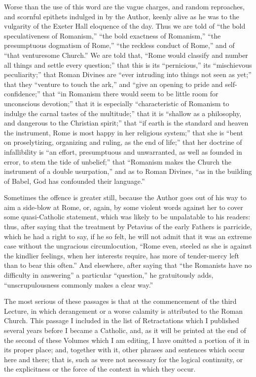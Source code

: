 Worse than the use of this word are the vague charges, and random
reproaches, and scornful epithets indulged in by the Author, keenly
alive as he was to the vulgarity of the Exeter Hall eloquence of the
day. Thus we are told of ``the bold speculativeness of
Romanism,'' ``the bold exactness of Romanism,'' ``the
presumptuous dogmatism of Rome,'' ``the reckless conduct of
Rome,'' and of ``that venturesome Church.'' We are told
that, ``Rome would classify and number all things and settle every
question;'' that this is its ``pernicious,'' its
``mischievous peculiarity;'' that Roman Divines are ``ever
intruding into things not seen as yet;'' that they ``venture
to touch the ark,'' and ``give an opening to pride and
self-confidence;'' that ``in Romanism there would seem to be
little room for unconscious devotion;'' that it is especially
``characteristic of Romanism to indulge the carnal tastes of the
multitude;'' that it is ``shallow as a philosophy, and
dangerous to the Christian spirit;'' that ``if earth is the
standard and heaven the instrument, Rome is most happy in her
religious system;'' that she is ``bent on proselytizing,
organizing and ruling, as the end of life;'' that her doctrine of
infallibility is ``an effort, presumptuous and unwarranted,
as well as founded in error, to stem the tide of unbelief;'' that
``Romanism makes the Church the instrument of a double
usurpation,'' and as to Roman Divines, ``as in the building of
Babel, God has confounded their language.''

Sometimes the offence is greater still, because the Author goes out
of his way to aim a side-blow at Rome, or, again, by some violent
words against her to cover some quasi-Catholic statement, which was
likely to be unpalatable to his readers: thus, after saying that the
treatment by Petavius of the early Fathers is parricide, which he had
a right to say, if he so felt, he will not admit that it was an
extreme case without the ungracious circumlocution, ``Rome even,
steeled as she is against the kindlier feelings, when her interests
require, has more of tender-mercy left than to bear this often.''
And elsewhere, after saying that ``the Romanists have no
difficulty in answering'' a particular ``question,'' he
gratuitously adds, ``unscrupulousness commonly makes a clear
way.''

The most serious of these passages is that at the commencement of
the third Lecture, in which derangement or a worse calamity is
attributed to the Roman Church. This passage I included in the list of
Retractations which I published several years before I became a
Catholic, and, as it will be printed at the end of the second of these
Volumes which I am editing, I have omitted a portion of it in
its proper place; and, together with it, other phrases and sentences
which occur here and there; that is, such as were not necessary for
the logical continuity, or the explicitness or the force of the
context in which they occur.

